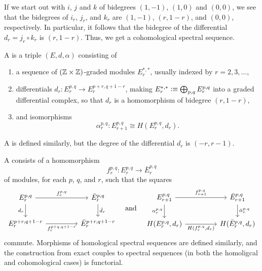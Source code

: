 \documentclass[reqno]{amsart}
\begin{document}
If we start out with $i$, $j$ and $k$ of bidegrees $(1,-1)$, $(1,0)$ and $(0,0)$, we see that the bidegrees of $i_r$, $j_r$, and $k_r$ are $(1,-1)$, $(r,1-r)$, and $(0,0)$, respectively. In particular, it follows that the bidegree of the differential $d_r=j_r\circ k_r$ is $(r,1-r)$. Thus, we get a cohomological spectral sequence.

\begin{defn}
A  is a triple $(E,d,\alpha)$ consisting of 
\begin{enumerate}
\item a sequence of $(\mathbb{Z}\times\mathbb{Z})$-graded modules $E_r^{\ast,\ast}$, usually indexed by $r=2,3,\ldots$,
\item differentials $d_r : E^{p,q}_r \to E^{p+r,q+1-r}_r$, making $E_r^{\ast,\ast}\vcentcolon\equiv\bigoplus_{p,q} E^{p,q}_r$ into a graded differential complex, so that $d_r$ is a homomorphism of bidegree $(r,1-r)$,
\item and isomorphisms
\begin{equation*}
\alpha_r^{p,q}:E^{p,q}_{r+1} \cong H(E^{p,q}_r,d_r).
\end{equation*}
\end{enumerate}
A  is defined similarly, but the degree of the differential $d_r$ is $(-r,r-1)$.

A  consists of a homomorphism
\begin{equation*}
f_r^{p,q}:E_r^{p,q}\to\bar{E}_r^{p,q}
\end{equation*}
of modules, for each $p$, $q$, and $r$, such that the squares
\begin{equation*}
\begin{tikzcd}[column sep=4.5em]
E_r^{p,q} \arrow[d,swap,"d_r"] \arrow[r,"f_r^{p,q}"] & \bar{E}_r^{p,q} \arrow[d,"\bar{d}_r"] \\
E_r^{p+r,q+1-r} \arrow[r,swap,"f_r^{p+q,q+1-r}"] & \bar{E}_r^{p+r,q+1-r}
\end{tikzcd}
\quad
\text{and}
\quad
\begin{tikzcd}[column sep=4.5em]
E_{r+1}^{p,q} \arrow[d,swap,"\alpha_r^{p,q}"] \arrow[r,"f_{r+1}^{p,q}"] & \bar{E}_{r+1}^{p,q} \arrow[d,"\bar{\alpha}_r^{p,q}"] \\
H(E_r^{p,q},d_r) \arrow[r,swap,"{H(f_r^{p,q},d_r)}"] & H(\bar{E}_r^{p,q},d_r)
\end{tikzcd}
\end{equation*}
commute. Morphisms of homological spectral sequences are defined similarly, and
the construction from exact couples to spectral sequences (in both the homoligcal
and cohomological cases) is functorial.
\end{defn}
\end{document}

